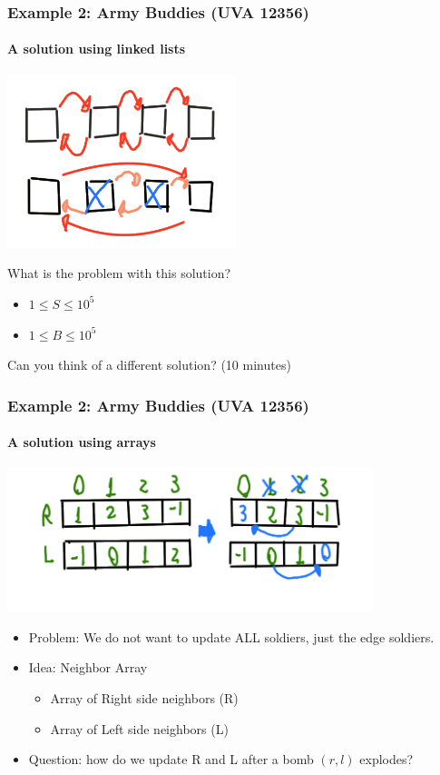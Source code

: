 \documentclass{beamer}
\begin{document}
\begin{frame}
  \frametitle{Example 2: Army Buddies (UVA 12356)}
  \framesubtitle{A solution using linked lists}

  \begin{center}
    \includegraphics[width=0.5\textwidth]{img/army-list}
  \end{center}

  What is the problem with this solution?

  \bigskip

  \begin{itemize}
  \item $1 \leq S \leq 10^5$
  \item $1 \leq B \leq 10^5$
  \end{itemize}

  Can you think of a different solution? (10 minutes)
\end{frame}


\begin{frame}
  \frametitle{Example 2: Army Buddies (UVA 12356)}
  \framesubtitle{A solution using arrays}

  \includegraphics[width=0.8\textwidth]{img/army-array}

  \begin{itemize}
  \item \alert{Problem}: We do not want to update ALL soldiers, just the edge soldiers.
  \item Idea: Neighbor Array
    \begin{itemize}
    \item Array of Right side neighbors (R)
    \item Array of Left side neighbors (L)
    \end{itemize}
  \item Question: how do we update R and L after a bomb $(r,l)$ explodes?\\
    \medskip
  \end{itemize}
\end{frame}
\end{document}
